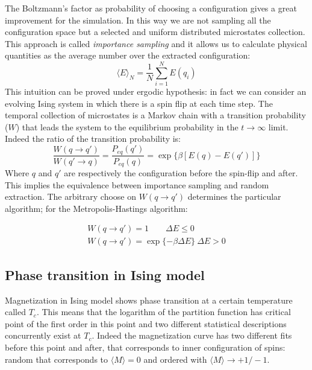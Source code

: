 \documentclass[11pt,a4paper]{article}
\begin{document}
\newpage
The Boltzmann's factor as probability of choosing a configuration gives a great improvement for the simulation. In this way we are not sampling all the configuration space but a selected and uniform distributed microstates collection. This approach is called \textit{importance sampling} and it allows us to calculate physical quantities as the average number over the extracted configuration:
\begin{equation}
\langle E \rangle_N = \dfrac{1}{N} \sum_{i=1}^{N}{E(q_i)}
\end{equation} This intuition can be proved under ergodic hypothesis: in fact we can consider an evolving Ising system in which there is a spin flip at each time step. The temporal collection of microstates is a Markov chain with a transition probability ($W$) that leads the system to the equilibrium probability in the $t \rightarrow \infty$ limit. Indeed the ratio of the transition probability is:
$$ \dfrac{W(q \rightarrow q')}{W(q' \rightarrow q)} = \dfrac{P_{eq}(q')}{P_{eq}(q)}= \exp \lbrace \beta [E(q) - E(q')] \rbrace $$
Where $q$ and $q'$ are respectively the configuration before the spin-flip and after. This implies the equivalence between importance sampling and random extraction. The arbitrary choose on $W(q \rightarrow q')$ determines the particular algorithm; for the Metropolis-Hastings algorithm:

\begin{eqnarray}
W(q \rightarrow q')=1 \qquad \Delta E \leq 0 \\
W(q \rightarrow q')=\exp \lbrace -\beta \Delta E  \rbrace  \: \Delta E > 0
\end{eqnarray}

\bigskip

\subsection*{Phase transition in Ising model}
Magnetization in Ising model shows phase transition at a certain temperature called $T_c$. This means that the logarithm of the partition function has critical point of the first order in this point and two different statistical descriptions concurrently exist at $T_c$. Indeed the magnetization curve has two different fits before this point and after, that corresponds to inner configuration of spins: random that corresponds to $\langle M \rangle = 0$ and ordered with $\langle M \rangle \rightarrow +1 / -1$. 
\end{document}
